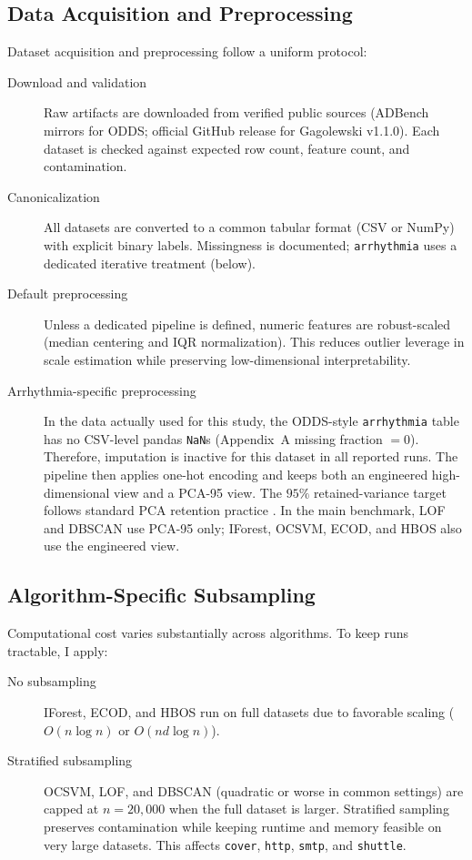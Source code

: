 \documentclass[cameraready]{Interspeech}
\begin{document}
\subsection{Data Acquisition and Preprocessing}

Dataset acquisition and preprocessing follow a uniform protocol:

\begin{description}
    \item[Download and validation] Raw artifacts are downloaded from verified public sources (ADBench mirrors for ODDS; official GitHub release for Gagolewski v1.1.0). Each dataset is checked against expected row count, feature count, and contamination.
    \item[Canonicalization] All datasets are converted to a common tabular format (CSV or NumPy) with explicit binary labels. Missingness is documented; \texttt{arrhythmia} uses a dedicated iterative treatment (below).
    \item[Default preprocessing] Unless a dedicated pipeline is defined, numeric features are robust-scaled (median centering and IQR normalization). This reduces outlier leverage in scale estimation while preserving low-dimensional interpretability.
    \item[Arrhythmia-specific preprocessing] In the data actually used for this study, the ODDS-style \texttt{arrhythmia} table has no CSV-level pandas \texttt{NaN}s (Appendix~A missing fraction \(=0\)). Therefore, imputation is inactive for this dataset in all reported runs. The pipeline then applies one-hot encoding and keeps both an engineered high-dimensional view and a PCA-95 view. The \(95\%\) retained-variance target follows standard PCA retention practice \cite{jolliffe2002pca}. In the main benchmark, LOF and DBSCAN use PCA-95 only; IForest, OCSVM, ECOD, and HBOS also use the engineered view.
\end{description}

\subsection{Algorithm-Specific Subsampling}

Computational cost varies substantially across algorithms. To keep runs tractable, I apply:

\begin{description}
    \item[No subsampling] IForest, ECOD, and HBOS run on full datasets due to favorable scaling (\(O(n \log n)\) or \(O(nd \log n)\)).
    \item[Stratified subsampling] OCSVM, LOF, and DBSCAN (quadratic or worse in common settings) are capped at \(n=20{,}000\) when the full dataset is larger. Stratified sampling preserves contamination while keeping runtime and memory feasible on very large datasets. This affects \texttt{cover}, \texttt{http}, \texttt{smtp}, and \texttt{shuttle}.
\end{description}
\end{document}
